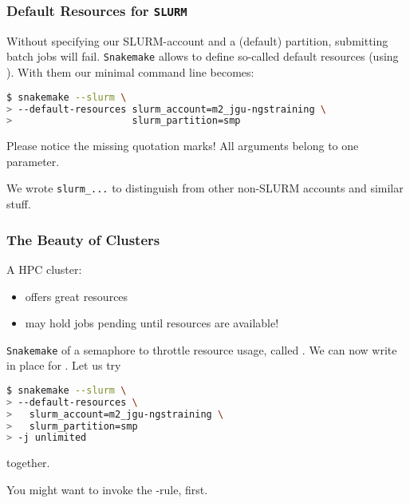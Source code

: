 \begin{frame}[fragile]
  \frametitle{Default Resources for \texttt{SLURM}}
  Without specifying our SLURM-account and a (default) partition, submitting batch jobs will fail. \texttt{Snakemake} allows to define so-called default resources (using ). With them our minimal command line becomes:
  \begin{lstlisting}[language=Bash, style=Shell, breaklines=true]
$ snakemake --slurm \
> --default-resources slurm_account=m2_jgu-ngstraining \
>                     slurm_partition=smp
  \end{lstlisting}
  \begin{hint}
  	Please notice the missing quotation marks! All arguments belong to one parameter.
  \end{hint}
  \begin{docs}
  	We wrote \texttt{slurm\_...} to distinguish from other non-SLURM accounts and similar stuff.
  \end{docs}
\end{frame}

\begin{frame}[fragile]
  \frametitle{The Beauty of Clusters}
  A HPC cluster:
  \begin{itemize}
   \item offers great resources
   \item may hold jobs pending until resources are available!
  \end{itemize}
  \pause
  \texttt{Snakemake} of a semaphore to throttle resource usage, called . We can now write  in place for . Let us try
  \begin{lstlisting}[language=Bash, style=Shell, basicstyle=\footnotesize]
$ snakemake --slurm \
> --default-resources \ 
>   slurm_account=m2_jgu-ngstraining \
>   slurm_partition=smp
> -j unlimited
  \end{lstlisting}
  together.
  \begin{hint}
  	You might want to invoke the -rule, first.
  \end{hint}
\end{frame}

